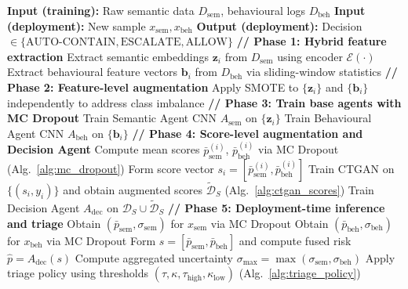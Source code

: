 \documentclass[lettersize,journal]{IEEEtran}
\begin{document}
\begin{algorithm}[t]
\caption{Agentic SABRE: Training and Deployment Pipeline}
\label{alg:agentic_sabre_pipeline}
\begin{algorithmic}[1]
    \State \textbf{Input (training):} Raw semantic data $D_{\text{sem}}$, behavioural logs $D_{\text{beh}}$
    \State \textbf{Input (deployment):} New sample $x_{\text{sem}}, x_{\text{beh}}$
    \State \textbf{Output (deployment):} Decision $\in \{\text{AUTO-CONTAIN}, \text{ESCALATE}, \text{ALLOW}\}$
    \vspace{1mm}
    \Statex \textbf{// Phase 1: Hybrid feature extraction}
    \State Extract semantic embeddings $\mathbf{z}_i$ from $D_{\text{sem}}$ using encoder $\mathcal{E}(\cdot)$
    \State Extract behavioural feature vectors $\mathbf{b}_i$ from $D_{\text{beh}}$ via sliding-window statistics
    \vspace{1mm}
    \Statex \textbf{// Phase 2: Feature-level augmentation}
    \State Apply SMOTE to $\{\mathbf{z}_i\}$ and $\{\mathbf{b}_i\}$ independently to address class imbalance
    \vspace{1mm}
    \Statex \textbf{// Phase 3: Train base agents with MC Dropout}
    \State Train Semantic Agent CNN $A_{\text{sem}}$ on $\{\mathbf{z}_i\}$
    \State Train Behavioural Agent CNN $A_{\text{beh}}$ on $\{\mathbf{b}_i\}$
    \vspace{1mm}
    \Statex \textbf{// Phase 4: Score-level augmentation and Decision Agent}
        \State Compute mean scores $\bar{p}_{\text{sem}}^{(i)}$, $\bar{p}_{\text{beh}}^{(i)}$ via MC Dropout (Alg.~\ref{alg:mc_dropout})
        \State Form score vector $s_i = [\bar{p}_{\text{sem}}^{(i)}, \bar{p}_{\text{beh}}^{(i)}]$
    \EndFor
    \State Train CTGAN on $\{(s_i, y_i)\}$ and obtain augmented scores $\tilde{\mathcal{D}}_S$ (Alg.~\ref{alg:ctgan_scores})
    \State Train Decision Agent $A_{\text{dec}}$ on $\mathcal{D}_S \cup \tilde{\mathcal{D}}_S$
    \vspace{1mm}
    \Statex \textbf{// Phase 5: Deployment-time inference and triage}
    \State Obtain $(\bar{p}_{\text{sem}}, \sigma_{\text{sem}})$ for $x_{\text{sem}}$ via MC Dropout
    \State Obtain $(\bar{p}_{\text{beh}}, \sigma_{\text{beh}})$ for $x_{\text{beh}}$ via MC Dropout
    \State Form $s = [\bar{p}_{\text{sem}}, \bar{p}_{\text{beh}}]$ and compute fused risk $\hat{p} = A_{\text{dec}}(s)$
    \State Compute aggregated uncertainty $\sigma_{\max} = \max(\sigma_{\text{sem}}, \sigma_{\text{beh}})$
    \State Apply triage policy using thresholds $(\tau, \kappa, \tau_{\text{high}}, \kappa_{\text{low}})$ (Alg.~\ref{alg:triage_policy})
\end{algorithmic}
\end{algorithm}
\end{document}
